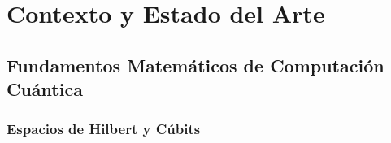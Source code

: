 \chapter{Contexto y Estado del Arte}\label{ch:estado_arte}





\section{Fundamentos Matemáticos de Computación Cuántica}

\subsection{Espacios de Hilbert y Cúbits}

